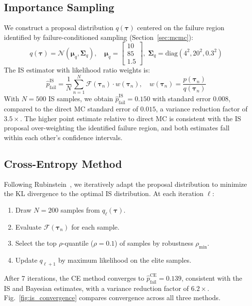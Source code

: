 \documentclass[conference]{IEEEtran}
\begin{document}
\subsection{Importance Sampling}
\label{sec:importance_sampling}

We construct a proposal distribution $q(\boldsymbol{\tau})$ centered on the failure region identified by failure-conditioned sampling (Section~\ref{sec:mcmc}):
\begin{equation}
    q(\boldsymbol{\tau}) = \mathcal{N}\!\left(\boldsymbol{\mu}_q, \boldsymbol{\Sigma}_q\right), \quad \boldsymbol{\mu}_q = \begin{bmatrix} 10 \\ 85 \\ 1.5 \end{bmatrix}, \; \boldsymbol{\Sigma}_q = \mathrm{diag}(4^2, 20^2, 0.3^2)
\end{equation}
The IS estimator with likelihood ratio weights is:
\begin{equation}
    \hat{p}_{\text{fail}}^{\text{IS}} = \frac{1}{N}\sum_{n=1}^{N} \mathcal{F}(\boldsymbol{\tau}_n) \cdot w(\boldsymbol{\tau}_n), \quad w(\boldsymbol{\tau}_n) = \frac{p(\boldsymbol{\tau}_n)}{q(\boldsymbol{\tau}_n)}
    \label{eq:is_estimator}
\end{equation}
With $N = 500$ IS samples, we obtain $\hat{p}_{\text{fail}}^{\text{IS}} = 0.150$ with standard error $0.008$, compared to the direct MC standard error of $0.015$, a variance reduction factor of $3.5\times$. The higher point estimate relative to direct MC is consistent with the IS proposal over-weighting the identified failure region, and both estimates fall within each other's confidence intervals.

\subsection{Cross-Entropy Method}
\label{sec:cross_entropy}

Following Rubinstein~\cite{rubinstein1999crossentropy, rubinstein2004crossentropy}, we iteratively adapt the proposal distribution to minimize the KL divergence to the optimal IS distribution. At each iteration $\ell$:
\begin{enumerate}
    \item Draw $N = 200$ samples from $q_\ell(\boldsymbol{\tau})$.
    \item Evaluate $\mathcal{F}(\boldsymbol{\tau}_n)$ for each sample.
    \item Select the top $\rho$-quantile ($\rho = 0.1$) of samples by robustness $\rho_{\min}$.
    \item Update $q_{\ell+1}$ by maximum likelihood on the elite samples.
\end{enumerate}
After 7 iterations, the CE method converges to $\hat{p}_{\text{fail}}^{\text{CE}} = 0.139$, consistent with the IS and Bayesian estimates, with a variance reduction factor of $6.2\times$. Fig.~\ref{fig:is_convergence} compares convergence across all three methods.
\end{document}
